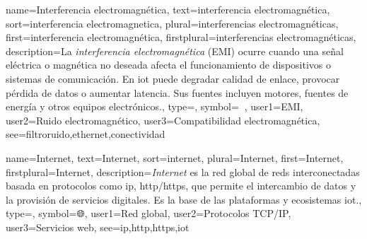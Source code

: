 	
	{
		name={Interferencia electromagn{\'e}tica},
		text={interferencia electromagn{\'e}tica},
		sort={interferencia electromagnetica},
		plural={interferencias electromagn{\'e}ticas},
		first={interferencia electromagn{\'e}tica},
		firstplural={interferencias electromagn{\'e}ticas},
		description={La \emph{interferencia electromagn{\'e}tica} (EMI) ocurre cuando una se{\~n}al el{\'e}ctrica o magn{\'e}tica no deseada afecta el funcionamiento de dispositivos o sistemas de comunicaci{\'o}n. En \gls{iot} puede degradar calidad de enlace, provocar p{\'e}rdida de \glspl{dato} o aumentar \gls{latencia}. Sus fuentes incluyen motores, fuentes de energ{\'i}a y otros equipos electr{\'o}nicos.},
		type=\glsdefaulttype,
		symbol={📡🚫},
		user1={EMI},
		user2={Ruido electromagn{\'e}tico},
		user3={Compatibilidad electromagn{\'e}tica},
		see={filtroruido,ethernet,conectividad}
	}
	
	{
		name={Internet},
		text={Internet},
		sort={internet},
		plural={Internet},
		first={Internet},
		firstplural={Internet},
		description={\emph{Internet} es la red global de \glspl{red} interconectadas basada en protocolos como \gls{ip}, \gls{http}/\gls{https}, que permite el intercambio de \glspl{dato} y la provisi{\'o}n de servicios digitales. Es la base de las plataformas y ecosistemas \gls{iot}.},
		type=\glsdefaulttype,
		symbol={🌐},
		user1={Red global},
		user2={Protocolos TCP/IP},
		user3={Servicios web},
		see={ip,http,https,iot}
	}
	
